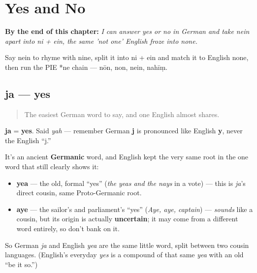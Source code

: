 
\chapter{Yes and No}
\label{ch:ge-yes-and-no}

\begin{chapteropening}
\textbf{By the end of this chapter:} \emph{I can answer yes or no in German and take nein apart into ni + ein, the same 'not one' English froze into none.}

Say nein to rhyme with nine, split it into ni + ein and match it to English none, then run the PIE *ne chain — nōn, non, nein, nahīṃ.
\end{chapteropening}

\section[ja]{ja — yes}

\label{lesson:GE-C18-ja}



\begin{quote}
The easiest German word to say, and one English almost shares.
\end{quote}

\begin{cousinweb}
\textbf{ja} = \textbf{yes}. Said \emph{yah} — remember German \textbf{j} is pronounced like English \textbf{y}, never the English \textquotedblleft{}j.\textquotedblright{}

It's an ancient \textbf{Germanic} word, and English kept the very same root in the one word that still clearly shows it:

\begin{itemize}
\raggedright
  \item \textbf{yea} — the old, formal \textquotedblleft{}yes\textquotedblright{} (\emph{the yeas and the nays} in a vote) — this is \emph{ja}'s direct cousin, same Proto-Germanic root.
  \item \textbf{aye} — the sailor's and parliament's \textquotedblleft{}yes\textquotedblright{} (\emph{Aye, aye, captain}) — \emph{sounds} like a cousin, but its origin is actually \textbf{uncertain}; it may come from a different word entirely, so don't bank on it.
\end{itemize}

So German \emph{ja} and English \emph{yea} are the same little word, split between two cousin languages. (English's everyday \emph{yes} is a compound of that same \emph{yea} with an old \textquotedblleft{}be it so.\textquotedblright{})
\end{cousinweb}

